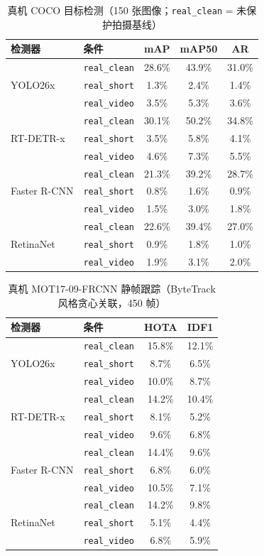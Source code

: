 \documentclass{ieeeaccess}
\begin{document}
\begin{table}[!t]
\caption{真机 COCO 目标检测（150 张图像；\texttt{real\_clean} = 未保护拍摄基线）}
\label{tab:real_coco}
\centering
\footnotesize
\begin{tabular}{llccc}
\toprule
检测器 & 条件 & mAP & mAP50 & AR \\
\midrule
\multirow{3}{*}{YOLO26x}
 & \texttt{real\_clean} & 28.6\% & 43.9\% & 31.0\% \\
 & \texttt{real\_short} & 1.3\% & 2.4\% & 1.4\% \\
 & \texttt{real\_video} & 3.5\% & 5.3\% & 3.6\% \\
\midrule
\multirow{3}{*}{RT-DETR-x}
 & \texttt{real\_clean} & 30.1\% & 50.2\% & 34.8\% \\
 & \texttt{real\_short} & 3.5\% & 5.8\% & 4.1\% \\
 & \texttt{real\_video} & 4.6\% & 7.3\% & 5.5\% \\
\midrule
\multirow{3}{*}{Faster R-CNN}
 & \texttt{real\_clean} & 21.3\% & 39.2\% & 28.7\% \\
 & \texttt{real\_short} & 0.8\% & 1.6\% & 0.9\% \\
 & \texttt{real\_video} & 1.5\% & 3.0\% & 1.8\% \\
\midrule
\multirow{3}{*}{RetinaNet}
 & \texttt{real\_clean} & 22.6\% & 39.4\% & 27.0\% \\
 & \texttt{real\_short} & 0.9\% & 1.8\% & 1.0\% \\
 & \texttt{real\_video} & 1.9\% & 3.1\% & 2.0\% \\
\bottomrule
\end{tabular}
\end{table}

\begin{table}[!t]
\caption{真机 MOT17-09-FRCNN 静帧跟踪（ByteTrack 风格贪心关联，450 帧）}
\label{tab:real_mot}
\centering
\footnotesize
\begin{tabular}{llcc}
\toprule
检测器 & 条件 & HOTA & IDF1 \\
\midrule
\multirow{3}{*}{YOLO26x}
 & \texttt{real\_clean} & 15.8\% & 12.1\% \\
 & \texttt{real\_short} & 8.7\% & 6.5\% \\
 & \texttt{real\_video} & 10.0\% & 8.7\% \\
\midrule
\multirow{3}{*}{RT-DETR-x}
 & \texttt{real\_clean} & 14.2\% & 10.4\% \\
 & \texttt{real\_short} & 8.1\% & 5.2\% \\
 & \texttt{real\_video} & 9.6\% & 6.8\% \\
\midrule
\multirow{3}{*}{Faster R-CNN}
 & \texttt{real\_clean} & 14.4\% & 9.6\% \\
 & \texttt{real\_short} & 6.8\% & 6.0\% \\
 & \texttt{real\_video} & 10.5\% & 7.1\% \\
\midrule
\multirow{3}{*}{RetinaNet}
 & \texttt{real\_clean} & 14.2\% & 9.8\% \\
 & \texttt{real\_short} & 5.1\% & 4.4\% \\
 & \texttt{real\_video} & 6.8\% & 5.9\% \\
\bottomrule
\end{tabular}
\end{table}
\end{document}
